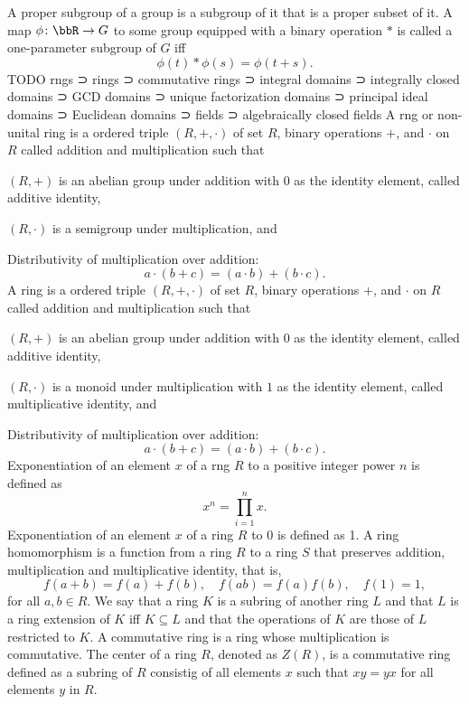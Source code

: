 \documentclass[a4paper,12pt]{article}
\begin{document}
A proper subgroup of a group is a subgroup of it that is a proper subset of it.
A map $\phi\colon\bbR\to G$ to some group equipped with a binary operation $*$ is called a one-parameter subgroup of $G$ iff
\[\phi(t)*\phi(s)=\phi(t+s).\]
TODO
rngs ⊃ rings ⊃ commutative rings ⊃ integral domains ⊃ integrally closed domains ⊃ GCD domains ⊃ unique factorization domains ⊃ principal ideal domains ⊃ Euclidean domains ⊃ fields ⊃ algebraically closed fields
A rng or non-unital ring is a ordered triple $(R,+,\cdot)$ of set $R$, binary operations $+$, and $\cdot$ on $R$ called addition and multiplication such that
\bit
\item $(R,+)$ is an abelian group under addition with $0$ as the identity element, called additive identity,
\item $(R,\cdot)$ is a semigroup under multiplication, and
\item Distributivity of multiplication over addition:
\[a\cdot (b+c)=(a\cdot b)+(b\cdot c).\]
\eit
{}
A ring is a ordered triple $(R,+,\cdot)$ of set $R$, binary operations $+$, and $\cdot$ on $R$ called addition and multiplication such that
\bit
\item $(R,+)$ is an abelian group under addition with $0$ as the identity element, called additive identity,
\item $(R,\cdot)$ is a monoid under multiplication with $1$ as the identity element, called multiplicative identity, and
\item Distributivity of multiplication over addition:
\[a\cdot (b+c)=(a\cdot b)+(b\cdot c).\]
\eit
{}
Exponentiation of an element $x$ of a rng $R$ to a positive integer power $n$ is defined as
\[x^n=\prod_{i=1}^nx.\]
Exponentiation of an element $x$ of a ring $R$ to 0 is defined as 1.
A ring homomorphism is a function from a ring $R$ to a ring $S$ that preserves addition, multiplication and multiplicative identity, that is,
\[f(a+b)=f(a)+f(b),\quad f(ab)=f(a)f(b),\quad f(1)=1,\]
for all $a,b\in R$.
We say that a ring $K$ is a subring of another ring $L$ and that $L$ is a ring extension of $K$ iff $K\subseteq L$ and that the operations of $K$ are those of $L$ restricted to $K$.
A commutative ring is a ring whose multiplication is commutative.
The center of a ring $R$, denoted as $Z(R)$, is a commutative ring defined as a subring of $R$ consistig of all elements $x$ such that $xy=yx$ for all elements $y$ in $R$.
\end{document}
